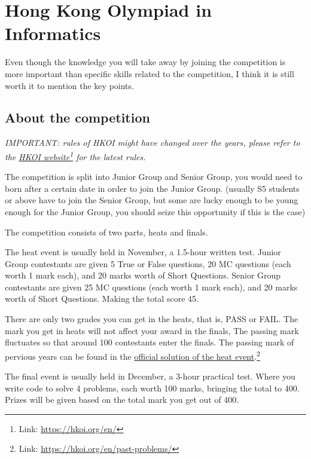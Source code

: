 \chapter{Hong Kong Olympiad in Informatics}

Even though the knowledge you will take away by joining the competition is more important than specific skills related to the competition, I think it is still worth it to mention the key points.

\section{About the competition}
\textit{IMPORTANT: rules of HKOI might have changed over the years, please refer to the \href{https://hkoi.org/en/}{HKOI website}\footnote{Link: \href{https://hkoi.org/en/}{https://hkoi.org/en/}} for the latest rules.}
\vspace{6mm}

The competition is split into Junior Group and Senior Group, you would need to born after a certain date in order to join the Junior Group. (usually S5 students or above have to join the Senior Group, but some are lucky enough to be young enough for the Junior Group, you should seize this opportunity if this is the case)
\vspace{6mm}

The competition consists of two parts, heats and finals.
\vspace{6mm}

The heat event is usually held in November, a 1.5-hour written test. Junior Group contestants are given 5 True or False questions, 20 MC questions (each worth 1 mark each), and 20 marks worth of Short Questions. Senior Group contestants are given 25 MC questions (each worth 1 mark each), and 20 marks worth of Short Questions. Making the total score 45. 

There are only two grades you can get in the heats, that is, PASS or FAIL. The mark you get in heats will not affect your award in the finals, The passing mark fluctuates so that around 100 contestants enter the finals. The passing mark of pervious years can be found in the \href{https://hkoi.org/en/past-problems/}{official solution of the heat event}.\footnote{Link: \href{https://hkoi.org/en/past-problems/}{https://hkoi.org/en/past-problems/}}
\vspace{6mm}

The final event is usually held in December, a 3-hour practical test. Where you write code to solve 4 problems, each worth 100 marks, bringing the total to 400. Prizes will be given based on the total mark you get out of 400.
\vspace{6mm}

